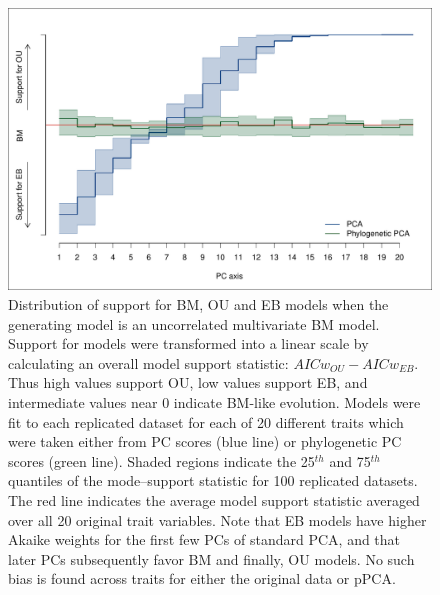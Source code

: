 \documentclass[a4paper,12pt]{article}
\begin{document}
\begin{figure}[p]
\centering
\includegraphics[scale=0.65]{./fig/uncor-bm-aic.pdf}
\caption{Distribution of support for BM, OU and EB models when the generating model is an uncorrelated multivariate BM model. Support for models were transformed into a linear scale by calculating an overall model support statistic: $AICw_{OU} - AICw_{EB}$. Thus high values support OU, low values support EB, and intermediate values near 0 indicate BM-like evolution. Models were fit to each replicated dataset for each of 20 different traits which were taken either from PC scores (blue line) or phylogenetic PC scores (green line). Shaded regions indicate the  25$^{th}$ and 75$^{th}$ quantiles of the mode--support statistic for  100 replicated datasets. The red  line indicates the average model support statistic averaged over all 20 original trait variables. Note that EB models have higher Akaike weights for the first few PCs of standard PCA, and that later PCs subsequently favor BM and finally, OU models. No such bias is found across traits for either the original data or pPCA.}
\label{aicwbm}
\end{figure}
\end{document}
